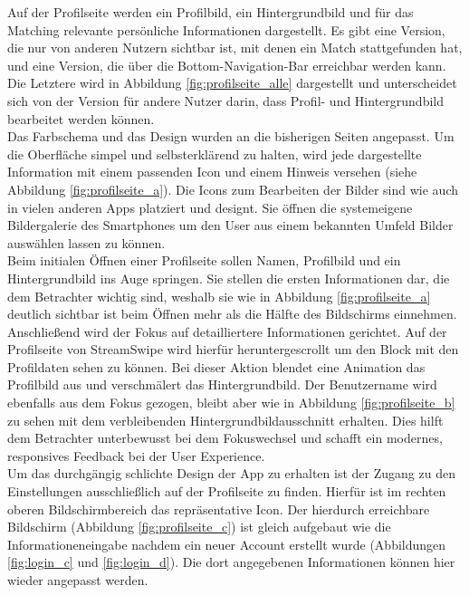 
Auf der Profilseite werden ein Profilbild, ein Hintergrundbild und für das Matching relevante persönliche Informationen dargestellt. Es gibt eine Version, die nur von anderen Nutzern sichtbar ist, mit denen ein Match stattgefunden hat, und eine Version, die über die Bottom-Navigation-Bar erreichbar werden kann. Die Letztere wird in Abbildung \ref{fig:profilseite_alle} dargestellt und unterscheidet sich von der Version für andere Nutzer darin, dass Profil- und Hintergrundbild bearbeitet werden können.\\
Das Farbschema und das Design wurden an die bisherigen Seiten angepasst. Um die Oberfläche simpel und selbsterklärend zu halten, wird jede dargestellte Information mit einem passenden Icon und einem Hinweis versehen (siehe Abbildung \ref{fig:profilseite_a}). Die Icons zum Bearbeiten der Bilder sind wie auch in vielen anderen Apps platziert und designt. Sie öffnen die systemeigene Bildergalerie des Smartphones um den User aus einem bekannten Umfeld Bilder auswählen lassen zu können.\\
Beim initialen Öffnen einer Profilseite sollen Namen, Profilbild und ein Hintergrundbild ins Auge springen. Sie stellen die ersten Informationen dar, die dem Betrachter wichtig sind, weshalb sie wie in Abbildung \ref{fig:profilseite_a} deutlich sichtbar ist  beim Öffnen mehr als die Hälfte des Bildschirms einnehmen. Anschließend wird der Fokus auf detailliertere Informationen gerichtet. Auf der Profilseite von StreamSwipe wird hierfür heruntergescrollt um den Block mit den Profildaten sehen zu können. Bei dieser Aktion blendet eine Animation das Profilbild aus und verschmälert das Hintergrundbild. Der Benutzername wird ebenfalls aus dem Fokus gezogen, bleibt aber wie in Abbildung \ref{fig:profilseite_b} zu sehen mit dem verbleibenden Hintergrundbildausschnitt erhalten. Dies hilft dem Betrachter unterbewusst bei dem Fokuswechsel und schafft ein modernes, responsives Feedback bei der User Experience.\\
Um das durchgängig schlichte Design der App zu erhalten ist der Zugang zu den Einstellungen ausschließlich auf der Profilseite zu finden. Hierfür ist im rechten oberen Bildschirmbereich das repräsentative Icon. Der hierdurch erreichbare Bildschirm (Abbildung \ref{fig:profilseite_c}) ist gleich aufgebaut wie die Informationeneingabe nachdem ein neuer Account erstellt wurde (Abbildungen \ref{fig:login_c} und \ref{fig:login_d}). Die dort angegebenen Informationen können hier wieder angepasst werden. %


